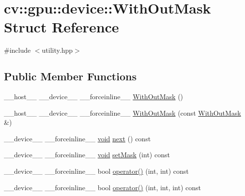 \hypertarget{structcv_1_1gpu_1_1device_1_1WithOutMask}{\section{cv\-:\-:gpu\-:\-:device\-:\-:With\-Out\-Mask Struct Reference}
\label{structcv_1_1gpu_1_1device_1_1WithOutMask}
}


{\ttfamily \#include $<$utility.\-hpp$>$}

\subsection*{Public Member Functions}
\begin{DoxyCompactItemize}
\item 
\-\_\-\-\_\-host\-\_\-\-\_\- \-\_\-\-\_\-device\-\_\-\-\_\- \-\_\-\-\_\-forceinline\-\_\-\-\_\- \hyperlink{structcv_1_1gpu_1_1device_1_1WithOutMask_ae737882d63478aee4abacf1b3093b62b}{With\-Out\-Mask} ()
\item 
\-\_\-\-\_\-host\-\_\-\-\_\- \-\_\-\-\_\-device\-\_\-\-\_\- \-\_\-\-\_\-forceinline\-\_\-\-\_\- \hyperlink{structcv_1_1gpu_1_1device_1_1WithOutMask_a0f00d5e32d6d2447299a467052ac19a4}{With\-Out\-Mask} (const \hyperlink{structcv_1_1gpu_1_1device_1_1WithOutMask}{With\-Out\-Mask} \&)
\item 
\-\_\-\-\_\-device\-\_\-\-\_\- \-\_\-\-\_\-forceinline\-\_\-\-\_\- \hyperlink{legacy_8hpp_a8bb47f092d473522721002c86c13b94e}{void} \hyperlink{structcv_1_1gpu_1_1device_1_1WithOutMask_a304b853f20eb2bf3fc34e106af762c9a}{next} () const 
\item 
\-\_\-\-\_\-device\-\_\-\-\_\- \-\_\-\-\_\-forceinline\-\_\-\-\_\- \hyperlink{legacy_8hpp_a8bb47f092d473522721002c86c13b94e}{void} \hyperlink{structcv_1_1gpu_1_1device_1_1WithOutMask_a759a6bddca7858aef9918530a463b461}{set\-Mask} (int) const 
\item 
\-\_\-\-\_\-device\-\_\-\-\_\- \-\_\-\-\_\-forceinline\-\_\-\-\_\- bool \hyperlink{structcv_1_1gpu_1_1device_1_1WithOutMask_aced175c99fb15d41544432f39ca9ea14}{operator()} (int, int) const 
\item 
\-\_\-\-\_\-device\-\_\-\-\_\- \-\_\-\-\_\-forceinline\-\_\-\-\_\- bool \hyperlink{structcv_1_1gpu_1_1device_1_1WithOutMask_a10be7d2bb227584c06c2160dcc1f347f}{operator()} (int, int, int) const 
\end{DoxyCompactItemize}
